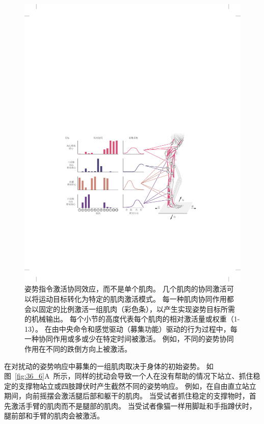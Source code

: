 \begin{figure}[htbp]
	\centering
	\includegraphics[width=1.0\linewidth]{chap36/fig_36_5}
	\caption{姿势指令激活协同效应，而不是单个肌肉。
		几个肌肉的协同激活可以将运动目标转化为特定的肌肉激活模式。
		每一种肌肉协同作用都会以固定的比例激活一组肌肉（彩色条），以产生实现姿势目标所需的机械输出。
		每个小节的高度代表每个肌肉的相对激活量或权重（1-13）。
		在由中央命令和感觉驱动（募集功能）驱动的行为过程中，每一种协同作用或多或少在特定时间被激活。
		例如，不同的姿势协同作用在不同的跌倒方向上被激活。}
	\label{fig:36_5}
\end{figure}


在对扰动的姿势响应中募集的一组肌肉取决于身体的初始姿势。
如图~\ref{fig:36_6}A~所示，同样的扰动会导致一个人在没有帮助的情况下站立、抓住稳定的支撑物站立或四肢蹲伏时产生截然不同的姿势响应。
例如，在自由直立站立期间，向前摇摆会激活腿后部和躯干的肌肉。
当受试者抓住稳定的支撑物时，首先激活手臂的肌肉而不是腿部的肌肉。
当受试者像猫一样用脚趾和手指蹲伏时，腿前部和手臂的肌肉会被激活。


